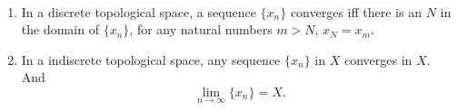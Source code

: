 \begin{example}
	\
	\begin{enumerate}
		\item
		In a discrete topological space, a sequence $\{x_n\}$ converges iff there is an $N$ in the domain of $\{x_n\}$, for any natural numbers $m > N$, $x_N = x_m$.
		
		\item
		In a indiscrete topological space, any sequence $\{x_n\}$ in $X$ converges in $X$. And
		$$
		\lim_{n \to \infty} \{x_n\} = X.
		$$
	\end{enumerate}
\end{example}






































%